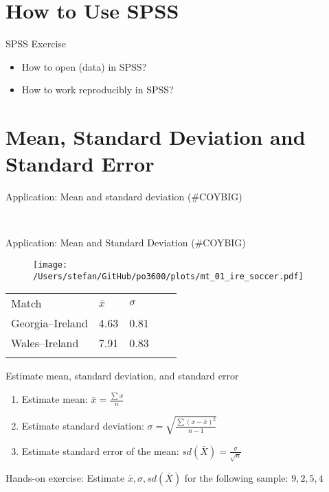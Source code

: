 \documentclass[10pt]{beamer}
\begin{document}
\section{How to Use SPSS}
\begin{frame}{SPSS Exercise}
\begin{itemize}
\item How to open (data) in SPSS?
\item How to work reproducibly in SPSS?
\end{itemize}
\end{frame}


\section{Mean, Standard Deviation and Standard Error}

\begin{frame}{Application: Mean and standard deviation (\#COYBIG)}

\begin{figure} \centering
{} \\ \vspace{.5cm}
\end{figure}
\end{frame}

\begin{frame}{Application: Mean and Standard Deviation (\#COYBIG)}

\begin{figure} \centering
\texttt{[image: /Users/stefan/GitHub/po3600/plots/mt\_01\_ire\_soccer.pdf]}
\end{figure}

\begin{table}[]
\centering \footnotesize
\begin{tabular}{lllll}
Match & $\bar{x}$ & $\sigma$ &  &  \\
Georgia--Ireland & 4.63 & 0.81 &  &  \\
Wales--Ireland & 7.91 & 0.83 &  &  \\
 &  &  &  & 
\end{tabular}
\end{table}
\end{frame}

\begin{frame}{Estimate  mean, standard deviation, and standard error}
\begin{enumerate}
\item Estimate mean: $\bar{x}=\frac{\sum{x}}{n}$
\item Estimate standard deviation: $\sigma=\sqrt{\frac{\sum(x-\bar{x})^{2}}{n-1}}$
\item Estimate standard error of the mean: $sd(\bar{X})=\frac{\sigma}{\sqrt{n}}$
\end{enumerate}
\pause
Hands-on exercise: Estimate $\bar{x},\sigma, sd(\bar{X})$ for the following sample:
$9, 2, 5, 4$
\end{frame}
\end{document}
